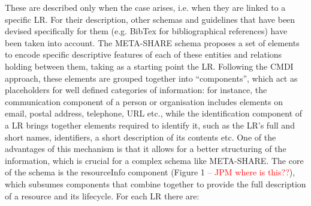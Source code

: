 \documentclass{llncs}
\begin{document}
These are described only when the case arises, i.e. when they are linked to a specific LR. For their description, other schemas and guidelines that have been devised specifically for them (e.g. BibTex for bibliographical references) have been taken into account.
The META-SHARE schema proposes a set of elements to encode specific descriptive
features of each of these entities and relations holding between them, taking as
a starting point the LR. Following the CMDI approach, these elements are grouped
together into ``components'', which act as placeholders for well defined categories of information: for instance, the communication component of a person or organisation includes elements on email, postal address, telephone, URL etc., while the identification component of a LR brings together elements required to identify it, such as the LR's full and short names, identifiers, a short description of its contents etc. One of the advantages of this mechanism is that it allows for a better structuring of the information, which is crucial for a complex schema like META-SHARE.
The core of the schema is the resourceInfo component (Figure
1\textcolor{red}{ -- JPM where is this??}), which subsumes components that combine together to provide the full description of a resource and its lifecycle. For each LR there are:
\end{document}
